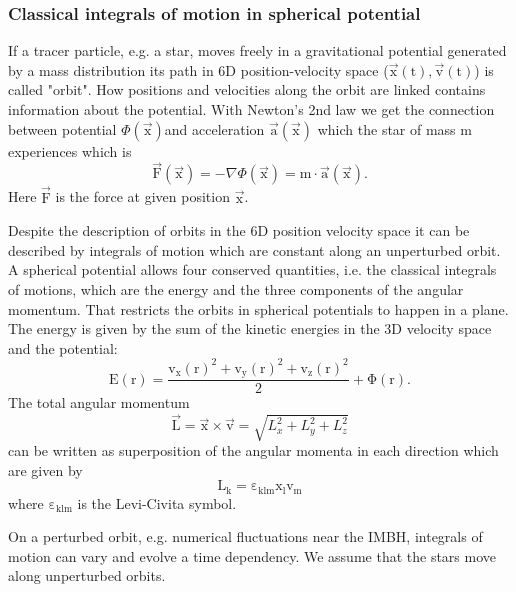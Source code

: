 \subsubsection{Classical integrals of motion in spherical potential}\label{sec:iof}
If a tracer particle, e.g. a star, moves freely in a gravitational potential generated by a mass distribution its path in 6D position-velocity space (\(\vec{\mathrm{x}}(\mathrm{t}),\vec{\mathrm{v}}(\mathrm{t})\)) is called "orbit".
How positions and velocities along the orbit are linked contains information about the potential. With Newton's 2nd law we get the connection between potential \(\Phi(\vec{\mathrm{x}})\)and acceleration \(\vec{\mathrm{a}}(\vec{\mathrm{x}})\) which the star of mass m experiences which is 
\begin{equation}\label{eq:Newton}
\vec{\mathrm{F}}(\vec{\mathrm{x}})=-\nabla\Phi(\vec{\mathrm{x}})=\mathrm{m}\cdot\vec{\mathrm{a}}(\vec{\mathrm{x}}).  
\end{equation}
Here \(\vec{\mathrm{F}}\) is the force at given position \(\vec{\mathrm{x}}\).
\par Despite the description of orbits in the 6D position velocity space it can be described by integrals of motion which are constant along an unperturbed orbit. A spherical potential allows four conserved quantities, i.e. the classical integrals of motions, which are the energy and the three components of the angular momentum. That restricts the orbits in spherical potentials to happen in a plane. The energy is given by the sum of the kinetic energies in the 3D velocity space and the potential:
\begin{equation}\label{eq:energy}
\mathrm{E(r)=\frac{v_x(r)^2+v_y(r)^2+v_z(r)^2}{2}+\Phi(r)}.
\end{equation}
The total angular momentum
\begin{equation}\label{eq:total_ang_mom}
\vec{\mathrm{L}}=\vec{\mathrm{x}}\times\vec{\mathrm{v}}=\sqrt{L_x^2+L_y^2+L_z^2}
\end{equation}
can be written as superposition of the angular momenta in each direction which are given by 
\begin{equation}\label{eq:ang_mom}
\mathrm{L_k=\varepsilon_{klm}x_l v_m}
\end{equation}
where \(\mathrm{\varepsilon_{klm}}\) is the Levi-Civita symbol.  
\par On a perturbed orbit, e.g. numerical fluctuations near the \ac{IMBH}, integrals of motion can vary and evolve a time dependency. We assume that the stars move along unperturbed orbits. 
